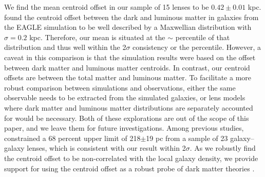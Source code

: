 \documentclass{aa}
\begin{document}


We find the mean centroid offset in our sample of 15 lenses to be $0.42 \pm 0.01$ kpc.
\citet{Schaller15} found the centroid offset between the dark and luminous matter in galaxies from the EAGLE simulation to be well described by a Maxwellian distribution with $\sigma = 0.2$ kpc. Therefore, our mean is situated at the $\sim$ percentile of that distribution and thus well within the 2$\sigma$ consistency or the  percentile. However, a caveat in this comparison is that the simulation results were based on the offset between dark matter and luminous matter centroids. In contrast, our centroid offsets are between the total matter and luminous matter. To facilitate a more robust comparison between simulations and observations, either the same observable needs to be extracted from the simulated galaxies, or lens models where dark matter and luminous matter distributions are separately accounted for \citep[e.g.,][]{Suyu14, Shajib20, Shajib22b} would be necessary. Both of these explorations are out of the scope of this paper, and we leave them for future investigations.
Among previous studies, \citet{Shajib21} constrained a 68 percent upper limit of 218$\pm$19 pc from a sample of 23 galaxy--galaxy lenses, which is consistent with our result within 2$\sigma$. As we robustly find the centroid offset to be non-correlated with the local galaxy density, we provide support for using the centroid offset as a robust probe of dark matter theories \citep{Harvey14, Kahlhoefer14, Robertson17}.
\end{document}
